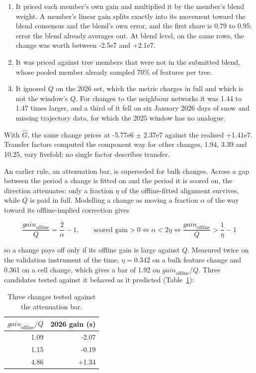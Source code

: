 \documentclass[
  manuscript=article,
  layout=preprint,
  year=2026,
  volume=x,
]{extra/joas}
\begin{document}
\begin{enumerate}
\item
  It priced each member's own gain and multiplied it by the member's blend weight. A member's linear gain splits exactly into its movement toward the blend consensus and the blend's own error, and the first share is 0.79 to 0.95: error the blend already averages out. At blend level, on the same rows, the change was worth between -2.5e7 and +2.1e7.
\item
  It was priced against tree members that were not in the submitted blend, whose pooled member already sampled 70\% of features per tree.
\item
  It ignored $Q$ on the 2026 set, which the metric charges in full and which is not the window's $Q$. For changes to the neighbour networks it was 1.44 to 1.47 times larger, and a third of it fell on six January 2026 days of snow and missing trajectory data, for which the 2025 window has no analogue.
\end{enumerate}

With $\hat{G}$, the same change prices at -5.77e6 $\pm$ 2.37e7 against the realised +1.41e7. Transfer factors computed the component way for other changes, 1.94, 3.39 and 10.25, vary fivefold: no single factor describes transfer.

An earlier rule, an attenuation bar, is superseded for bulk changes. Across a gap between the period a change is fitted on and the period it is scored on, the direction attenuates: only a fraction $\eta$ of the offline-fitted alignment survives, while $Q$ is paid in full. Modelling a change as moving a fraction $\alpha$ of the way toward its offline-implied correction gives

\begin{equation}
  \frac{\mathit{gain}_{\mathrm{offline}}}{Q} = \frac{2}{\alpha} - 1, \qquad
  \text{scored gain} > 0 \iff \alpha < 2\eta \iff \frac{\mathit{gain}_{\mathrm{offline}}}{Q} > \frac{1}{\eta} - 1
  \label{eq:attenuation}
\end{equation}

so a change pays off only if its offline gain is large against $Q$. Measured twice on the validation instrument of the time, $\eta = 0.342$ on a bulk feature change and 0.361 on a cell change, which gives a bar of 1.92 on $\mathit{gain}_{\mathrm{offline}}/Q$. Three candidates tested against it behaved as it predicted (Table~\ref{tab:24}):

\begin{table}[htbp!]
  \centering
  \small
  \setlength{\tabcolsep}{5pt}\renewcommand{\arraystretch}{1.15}
  \caption{Three changes tested against the attenuation bar.}
  \label{tab:24}
  \begin{tabular*}{\linewidth}{@{\extracolsep{\fill}}rr}
  \toprule
  $\mathit{gain}_{\mathrm{offline}}/Q$ & \textbf{2026 gain (s)} \\
  \midrule
  1.09 & -2.07 \\
  1.15 & -0.19 \\
  4.86 & +1.34 \\
  \bottomrule
  \end{tabular*}
\end{table}
\end{document}
